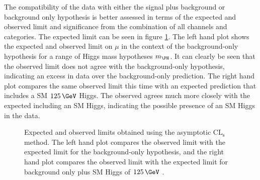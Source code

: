 The compatibility of the data with either the signal plus background or
background only hypothesis is better assessed in terms of the expected and observed
limit and significance from the combination of all channels and categories. The
expected limit can be seen in figure \ref{fig:results-limit}. The left hand plot
shows the expected and observed limit on $\mu$ in the context of the
background-only hypothesis for a range of Higgs mass hypotheses $m_{\PH}$. 
It can clearly be seen that the observed limit does not agree with the
background-only hypothesis, indicating an excess in data over the background-only
prediction. The right hand plot compares the same observed limit this time with
an expected prediction that includes a \ac{SM} $125\,\GeV$ Higgs. The observed
agrees much more closely with the expected including an \ac{SM} Higgs,
indicating the possible presence of an \ac{SM} Higgs in the data. 

\begin{figure}[h!]
\caption[Expected and observed limits on $\mu$ obtained using the asymptotic
$\mathrm{CL_{s}}$
method.]{Expected and observed limits obtained using the asymptotic
$\mathrm{CL_{s}}$
method. The left hand plot compares the observed limit with the expected limit
for the background-only hypothesis, and the right hand plot compares the observed
limit with the expected limit for background only plus \ac{SM} Higgs of
$125\,\GeV$ \cite{HIG-13-004}. }
\label{fig:results-limit}
\end{figure}


